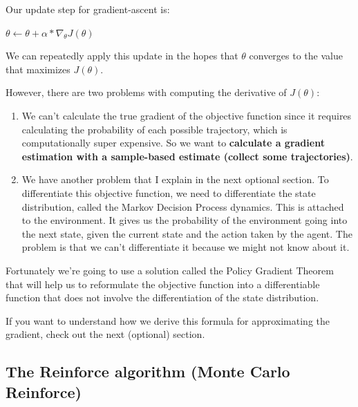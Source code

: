 \documentclass[11pt,a4paper]{article}
\begin{document}
Our update step for gradient-ascent is:

\(\theta \leftarrow \theta + \alpha *  \nabla_\theta J(\theta)\)

We can repeatedly apply this update in the hopes that \(\theta\) converges to the value that maximizes \(J(\theta)\).

However, there are two problems with computing the derivative of \(J(\theta)\):

\begin{enumerate}
\def\labelenumi{\arabic{enumi}.}
\item
  We can't calculate the true gradient of the objective function since it requires calculating the probability of each possible trajectory, which is computationally super expensive. So we want to \textbf{calculate a gradient estimation with a sample-based estimate (collect some trajectories)}.
\item
  We have another problem that I explain in the next optional section. To differentiate this objective function, we need to differentiate the state distribution, called the Markov Decision Process dynamics. This is attached to the environment. It gives us the probability of the environment going into the next state, given the current state and the action taken by the agent. The problem is that we can't differentiate it because we might not know about it.
\end{enumerate}


Fortunately we're going to use a solution called the Policy Gradient Theorem that will help us to reformulate the objective function into a differentiable function that does not involve the differentiation of the state distribution.


If you want to understand how we derive this formula for approximating the gradient, check out the next (optional) section.

\subsection{The Reinforce algorithm (Monte Carlo Reinforce)}\label{the-reinforce-algorithm-monte-carlo-reinforce}
\end{document}
